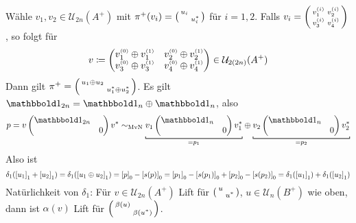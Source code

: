 \begin{beweis}[Idee]
	Wähle $v_1, v_2 \in \mathcal{U}_{2n}(A^+)$ mit $\pi^+(v_i) = \begin{psmallmatrix} u_i & \\ & u_i^* \end{psmallmatrix}$ für $i=1,2$.
	Falls $v_i = \begin{psmallmatrix}
		v_1^{\scriptscriptstyle(i)} & v_2^{\scriptscriptstyle(i)} \\ v_3^{\scriptscriptstyle(i)} & v_4^{\scriptscriptstyle(i)}
	\end{psmallmatrix}$, so folgt für
	\[
		v \coloneqq \begin{pmatrix}
			v_1^{\scriptscriptstyle(0)} \oplus v_1^{\scriptscriptstyle(1)} & v_2^{\scriptscriptstyle(0)} \oplus v_2^{\scriptscriptstyle(1)} \\
			v_3^{\scriptscriptstyle(0)} \oplus v_3^{\scriptscriptstyle(1)} & v_4^{\scriptscriptstyle(0)} \oplus v_4^{\scriptscriptstyle(1)}
		\end{pmatrix} \in \mathcal{U}_{2(2n)}(A^+)
	\]
	Dann gilt $\pi^+ = \begin{psmallmatrix}
		u_1 \oplus u_2 & \\ & u_1^* \oplus u_2^*
	\end{psmallmatrix}$.
	Es gilt $\ind_{2n} = \ind_n \oplus \ind_n$, also
	\[
		p = v \begin{pmatrix}
			\ind_{2n} & \\ & 0
		\end{pmatrix} v^* \sim_{\MvN} \Underbracket{v_1 \begin{pmatrix}
			\ind_n & \\ & 0
		\end{pmatrix} v_1^*}{=p_1} \oplus \Underbracket{v_2 \begin{pmatrix}
			\ind_n & \\ & 0
		\end{pmatrix}v_2^*}{= p_2}
	\]
	Also ist 
	\[
		\delta_1 \enbrace*{\benbrace*{u_1}_1 + \benbrace*{u_2}_1} = \delta_1 \enbrace*{\benbrace*{u_1 \oplus u_2}_1} = \benbrace*{p}_0 - \benbrace*{s(p)}_0 = \benbrace*{p_1}_0 - \benbrace*{s(p_1)}_0 + \benbrace*{p_2}_0 - \benbrace*{s(p_2)}_0 = \delta_1 \enbrace*{\benbrace*{u_1}_1} + \delta_1 \enbrace*{\benbrace*{u_2}_1}
	\]
	Natürlichkeit von $\delta_1$:
	Für $v \in \mathcal{U}_{2n}(A^+)$ Lift für $\begin{psmallmatrix} u & \\ & u^* \end{psmallmatrix}$, $u \in \mathcal{U}_n(B^+)$ wie oben, dann ist $\alpha(v)$ Lift für $\begin{psmallmatrix} \beta(u) & \\ & \beta(u^*) \end{psmallmatrix}$.

\end{beweis}
